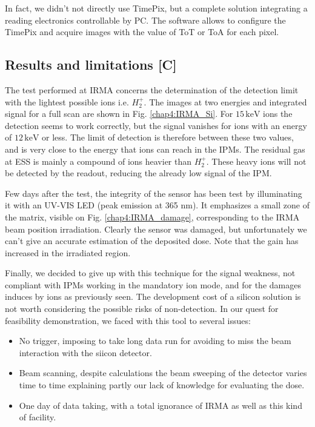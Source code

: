 \begin{refsection}
  In fact, we didn't not directly use TimePix, but a complete solution \cite{Kraus2011,advacam2019} integrating a reading electronics controllable by PC. The software allows to configure the TimePix and acquire images with the value of ToT or ToA for each pixel.

  \subsection{Results and limitations [C]}

  The test performed at IRMA concerns the determination of the detection limit with the lightest possible ions i.e. $H_{2}^{+}$. The images at two energies and integrated signal for a full scan are shown in Fig. \ref{chap4:IRMA_Si}. For $15\,\mathrm{keV}$ ions the detection seems to work correctly, but the signal vanishes for ions with an energy of $12\,\mathrm{keV}$ or less. The limit of detection is therefore between these two values, and is very close to the energy that ions can reach in the IPMs. The residual gas at ESS is mainly a compound of ions heavier than $H_{2}^{+}$. These heavy ions will not be detected by the readout, reducing the already low signal of the IPM.

  

  
  Few days after the test, the integrity of the sensor has been test by illuminating it with an UV-VIS LED (peak emission at 365 nm). It emphasizes a small zone of the matrix, visible on Fig. \ref{chap4:IRMA_damage}, corresponding to the IRMA  beam position irradiation. Clearly the sensor was damaged, but unfortunately we can't give an accurate estimation of the deposited dose. Note that the gain has increased in the irradiated region.

  Finally, we decided to give up with this technique for the signal weakness, not compliant with IPMs working in the mandatory  ion mode, and for the damages induces by ions as previously seen. The development cost of a silicon solution is not worth considering the possible risks of non-detection.
  In our quest for feasibility demonstration, we faced with this tool to several issues:
  \begin{itemize}
    \item No trigger, imposing to take long data run for avoiding to miss the beam interaction with the siicon detector.
    \item Beam scanning, despite calculations the beam sweeping of the detector varies time to time explaining partly our lack of knowledge for evaluating the dose.
    \item One day of data taking, with a total ignorance of IRMA as well as this kind of facility.
  \end{itemize}


\end{refsection}
